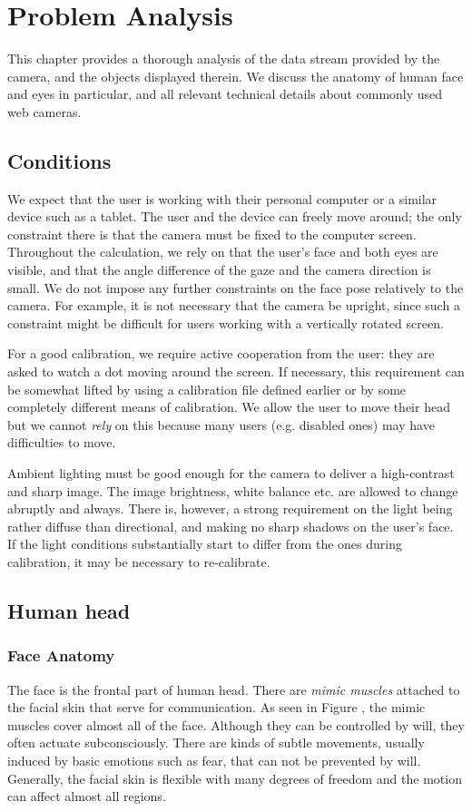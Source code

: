 \chapter{Problem Analysis}

This chapter provides a thorough analysis of the data stream provided by the camera, and the objects displayed therein.
We discuss the anatomy of human face and eyes in particular, and all relevant technical details about commonly used web cameras.

\section{Conditions}

We expect that the user is working with their personal computer or a similar device such as a tablet.
The user and the device can freely move around; the only constraint there is that the camera must be fixed to the computer screen.
Throughout the calculation, we rely on that the user's face and both eyes are visible, and that the angle difference of the gaze and the camera direction is small.
We do not impose any further constraints on the face pose relatively to the camera.
For example, it is not necessary that the camera be upright, since such a constraint might be difficult for users working with a vertically rotated screen.

For a good calibration, we require active cooperation from the user: they are asked to watch a dot moving around the screen.
If necessary, this requirement can be somewhat lifted by using a calibration file defined earlier or by some completely different means of calibration.
We allow the user to move their head but we cannot \textit{rely} on this because many users (e.g. disabled ones) may have difficulties to move.

Ambient lighting must be good enough for the camera to deliver a high-contrast and sharp image.
The image brightness, white balance etc. are allowed to change abruptly and always.
There is, however, a strong requirement on the light being rather diffuse than directional, and making no sharp shadows on the user's face.
If the light conditions substantially start to differ from the ones during calibration, it may be necessary to re-calibrate.

\section{Human head}

\subsection{Face Anatomy}
The face is the frontal part of human head.
There are \textit{mimic muscles} attached to the facial skin that serve for communication.
As seen in Figure , the mimic muscles cover almost all of the face.
Although they can be controlled by will, they often actuate subconsciously.
There are kinds of subtle movements, usually induced by basic emotions such as fear, that can not be prevented by will.
Generally, the facial skin is flexible with many degrees of freedom and the motion can affect almost all regions.

